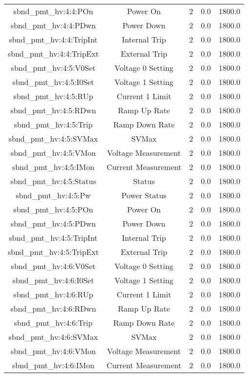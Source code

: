 \begin{center}
\begin{longtable}{c | c c c c }
sbnd\_pmt\_hv:4:4:POn & Power On & 2 & 0.0 & 1800.0\\ 
sbnd\_pmt\_hv:4:4:PDwn & Power Down & 2 & 0.0 & 1800.0\\ 
sbnd\_pmt\_hv:4:4:TripInt & Internal Trip & 2 & 0.0 & 1800.0\\ 
sbnd\_pmt\_hv:4:4:TripExt & External Trip & 2 & 0.0 & 1800.0\\ 
sbnd\_pmt\_hv:4:5:V0Set & Voltage 0 Setting & 2 & 0.0 & 1800.0\\ 
sbnd\_pmt\_hv:4:5:I0Set & Voltage 1 Setting & 2 & 0.0 & 1800.0\\ 
sbnd\_pmt\_hv:4:5:RUp & Current 1 Limit & 2 & 0.0 & 1800.0\\ 
sbnd\_pmt\_hv:4:5:RDwn & Ramp Up Rate & 2 & 0.0 & 1800.0\\ 
sbnd\_pmt\_hv:4:5:Trip & Ramp Down Rate & 2 & 0.0 & 1800.0\\ 
sbnd\_pmt\_hv:4:5:SVMax & SVMax & 2 & 0.0 & 1800.0\\ 
sbnd\_pmt\_hv:4:5:VMon & Voltage Measurement & 2 & 0.0 & 1800.0\\ 
sbnd\_pmt\_hv:4:5:IMon & Current Measurement & 2 & 0.0 & 1800.0\\ 
sbnd\_pmt\_hv:4:5:Status & Status & 2 & 0.0 & 1800.0\\ 
sbnd\_pmt\_hv:4:5:Pw & Power Status & 2 & 0.0 & 1800.0\\ 
sbnd\_pmt\_hv:4:5:POn & Power On & 2 & 0.0 & 1800.0\\ 
sbnd\_pmt\_hv:4:5:PDwn & Power Down & 2 & 0.0 & 1800.0\\ 
sbnd\_pmt\_hv:4:5:TripInt & Internal Trip & 2 & 0.0 & 1800.0\\ 
sbnd\_pmt\_hv:4:5:TripExt & External Trip & 2 & 0.0 & 1800.0\\ 
sbnd\_pmt\_hv:4:6:V0Set & Voltage 0 Setting & 2 & 0.0 & 1800.0\\ 
sbnd\_pmt\_hv:4:6:I0Set & Voltage 1 Setting & 2 & 0.0 & 1800.0\\ 
sbnd\_pmt\_hv:4:6:RUp & Current 1 Limit & 2 & 0.0 & 1800.0\\ 
sbnd\_pmt\_hv:4:6:RDwn & Ramp Up Rate & 2 & 0.0 & 1800.0\\ 
sbnd\_pmt\_hv:4:6:Trip & Ramp Down Rate & 2 & 0.0 & 1800.0\\ 
sbnd\_pmt\_hv:4:6:SVMax & SVMax & 2 & 0.0 & 1800.0\\ 
sbnd\_pmt\_hv:4:6:VMon & Voltage Measurement & 2 & 0.0 & 1800.0\\ 
sbnd\_pmt\_hv:4:6:IMon & Current Measurement & 2 & 0.0 & 1800.0\\ 

\end{longtable}
\end{center}
